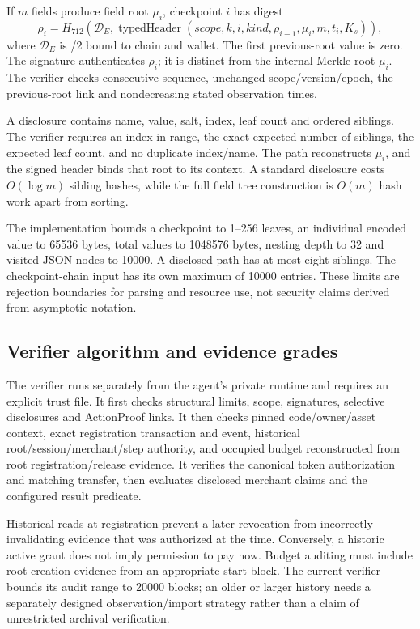 If $m$ fields produce field root $\mu_i$, checkpoint $i$ has digest
\begin{equation}
 \rho_i=H_{712}(\mathcal D_E,\operatorname{typedHeader}(scope,k,i,kind,\rho_{i-1},\mu_i,m,t_i,K_s)),
\end{equation}
where $\mathcal D_E$ is /2 bound to chain and wallet. The first previous-root value is zero. The signature authenticates $\rho_i$; it is distinct from the internal Merkle root $\mu_i$. The verifier checks consecutive sequence, unchanged scope/version/epoch, the previous-root link and nondecreasing stated observation times.

A disclosure contains name, value, salt, index, leaf count and ordered siblings. The verifier requires an index in range, the exact expected number of siblings, the expected leaf count, and no duplicate index/name. The path reconstructs $\mu_i$, and the signed header binds that root to its context. A standard disclosure costs $O(\log m)$ sibling hashes, while the full field tree construction is $O(m)$ hash work apart from sorting.

The implementation bounds a checkpoint to 1--256 leaves, an individual encoded value to 65536 bytes, total values to 1048576 bytes, nesting depth to 32 and visited JSON nodes to 10000. A disclosed path has at most eight siblings. The checkpoint-chain input has its own maximum of 10000 entries. These limits are rejection boundaries for parsing and resource use, not security claims derived from asymptotic notation.

\subsection{Verifier algorithm and evidence grades}

The verifier runs separately from the agent's private runtime and requires an explicit trust file. It first checks structural limits, scope, signatures, selective disclosures and ActionProof links. It then checks pinned code/owner/asset context, exact registration transaction and event, historical root/session/merchant/step authority, and occupied budget reconstructed from root registration/release evidence. It verifies the canonical token authorization and matching transfer, then evaluates disclosed merchant claims and the configured result predicate.

Historical reads at registration prevent a later revocation from incorrectly invalidating evidence that was authorized at the time. Conversely, a historic active grant does not imply permission to pay now. Budget auditing must include root-creation evidence from an appropriate start block. The current verifier bounds its audit range to 20000 blocks; an older or larger history needs a separately designed observation/import strategy rather than a claim of unrestricted archival verification.

